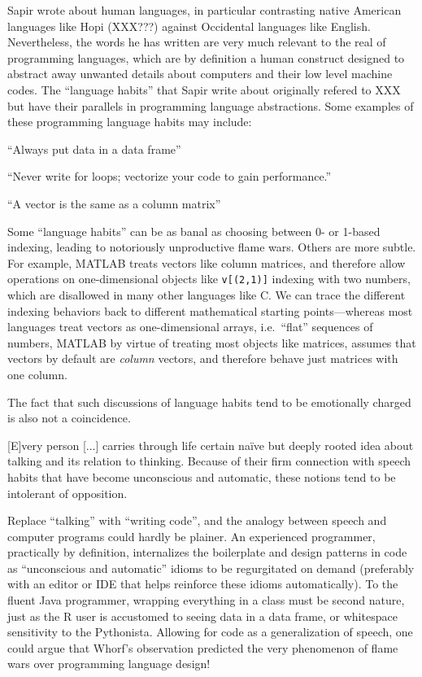 \documentclass[11pt]{asaproc}
\begin{document}
Sapir wrote about human languages, in particular contrasting native American
languages like Hopi (XXX???) against Occidental languages like English. Nevertheless,
the words he has written are very much relevant to the real of programming
languages, which are by definition a human construct designed to abstract away
unwanted details about computers and their low level machine codes.
The ``language habits'' that Sapir write about originally refered to XXX
but have their parallels in programming language abstractions. Some examples of
these programming language habits may include:

``Always put data in a data frame''

``Never write for loops; vectorize your code to gain performance.''

``A vector is the same as a column matrix''

Some ``language habits'' can be as banal as choosing between 0- or 1-based
indexing, leading to notoriously unproductive flame wars.
Others are more subtle. For example, MATLAB treats vectors like column matrices,
and therefore allow operations on one-dimensional objects like
\lstinline|v[(2,1)]| indexing with two numbers, which are disallowed
in many other languages like C. We can trace the different indexing behaviors
back to different mathematical starting points---whereas most languages treat
vectors as one-dimensional arrays, i.e.\ ``flat'' sequences of numbers, MATLAB
by virtue of treating most objects like matrices, assumes that vectors by default
are \textit{column} vectors, and therefore behave just matrices with one column.

The fact that such discussions of language habits tend to be emotionally
charged is also not a coincidence.

[E]very person [...] carries through life certain na\"ive but deeply rooted
idea about talking and its relation to thinking. Because of their firm
connection with speech habits that have become unconscious and automatic, these
notions tend to be intolerant of opposition.~\cite{Whorf1956sl}


Replace ``talking'' with ``writing code'', and the analogy between speech and
computer programs could hardly be plainer. An experienced programmer,
practically by definition, internalizes the boilerplate and design patterns in
code as ``unconscious and automatic'' idioms to be regurgitated on demand
(preferably with an editor or IDE that helps reinforce these idioms automatically).
To the fluent Java programmer, wrapping everything in a class must be second nature,
just as the R user is accustomed to seeing data in a data frame, or whitespace
sensitivity to the Pythonista.
Allowing for code as a generalization of speech, one could argue that Whorf's
observation predicted the very phenomenon of flame wars over programming language
design!
\end{document}
